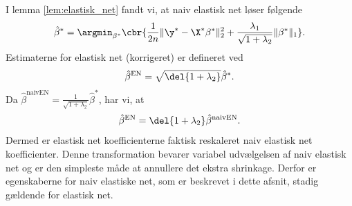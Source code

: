 I lemma \ref{lem:elastisk_net} fandt vi, at naiv elastisk net løser følgende 
\begin{align}
\hat{\beta}^* = \argmin_{\beta^*} \cbr{\frac{1}{2n} \Vert \y^* - \X^* \beta^* \Vert_2^2 + \frac{\lambda_1}{\sqrt{1+\lambda_2}} \Vert \beta^* \Vert_1}. \label{eq:EN8}
\end{align}
Estimaterne for elastisk net (korrigeret) er defineret ved
\begin{align*}
\hat{\beta}^\text{EN} = \sqrt{\del{1+\lambda_2}} \hat{\beta}^*.
\end{align*}
Da \(\hat{\beta}^\text{naivEN} = \frac{1}{\sqrt{1+\lambda_2}} \hat{\beta}^*\), har vi, at
\begin{align*}
\hat{\beta}^\text{EN} = \del{1+\lambda_2} \hat{\beta}^\text{naivEN}.
\end{align*}
Dermed er elastisk net koefficienterne faktisk reskaleret naiv elastisk net koefficienter.
Denne transformation bevarer variabel udvælgelsen af naiv elastisk net og er den simpleste måde at annullere det ekstra shrinkage.
Derfor er egenskaberne for naiv elastiske net, som er beskrevet i dette afsnit, stadig gældende for elastisk net.

